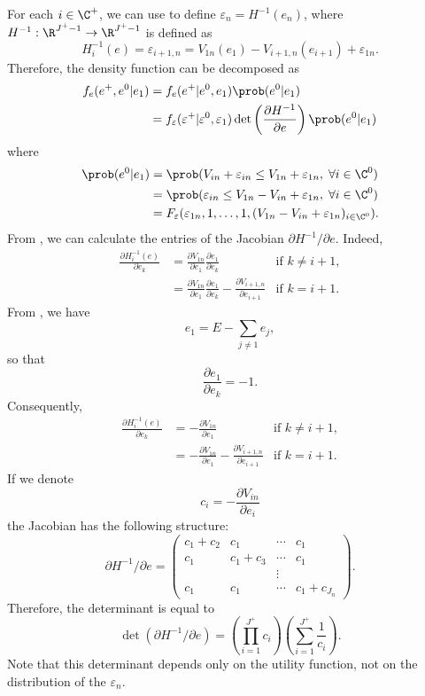 \documentclass[12pt,a4paper]{article}
\begin{document}
For each $i \in \C^+$, we can use 
to define $\varepsilon_n = H^{-1}(e_n)$, where $H^{-1}:\R^{J^+-1}\to\R^{J^+-1}$ is defined as  
\begin{equation}
  \label{eq:change_variable}
H_i^{-1}(e) = \varepsilon_{i+1,n}   =   V_{1n}(e_1) - V_{i+1,n}(e_{i+1}) + \varepsilon_{1n}.
\end{equation}
Therefore, the density function can be decomposed as
\begin{align*}
  f_e(e^+, e^0 | e_1) &= f_e(e^+ | e^0, e_1) \prob(e^0 |e_1) \\
                     &= f_\varepsilon(\varepsilon^+ | \varepsilon^0, \varepsilon_1) \det \left( \frac{\partial H^{-1}}{\partial e}\right)  \prob(e^0 |e_1)
\end{align*}
where
\begin{align*}
  \prob(e^0 |e_1) &= \prob(V_{in} + \varepsilon_{in}  \leq V_{1n} + \varepsilon_{1n},\; \forall i\in\C^0) \\
  &= \prob(\varepsilon_{in}  \leq V_{1n} -V_{in} + \varepsilon_{1n},\; \forall i\in\C^0) \\
  &= F_\varepsilon(\varepsilon_{1n}, 1, \ldots, 1, (V_{1n} -V_{in} + \varepsilon_{1n})_{i\in \C^0}).
\end{align*}
From , we can calculate the entries of the Jacobian $\partial H^{-1}/\partial e$. Indeed,
\begin{align*}
  \frac{\partial H_i^{-1}(e)}{\partial e_k} &= \frac{\partial V_{1n}}{\partial e_1}\frac{\partial e_1}{\partial e_k}  & \text{if } k \neq i+1, \\
  &= \frac{\partial V_{1n}}{\partial e_1}\frac{\partial e_1}{\partial e_k} - \frac{\partial V_{i+1,n}}{\partial e_{i+1}}& \text{if } k = i+1.
\end{align*}
From , we have
\[
e_1 = E - \sum_{j\neq 1} e_j,
\]
so that
\[
\frac{\partial e_1}{\partial e_k} = -1.
\]
Consequently,
\begin{align*}
  \frac{\partial H_i^{-1}(e)}{\partial e_k} &= -\frac{\partial V_{1n}}{\partial e_1}  & \text{if } k \neq i+1, \\
  &= -\frac{\partial V_{1n}}{\partial e_1} - \frac{\partial V_{i+1,n}}{\partial e_{i+1}}& \text{if } k = i+1.
\end{align*}
If we denote
\begin{equation}
c_i =  - \frac{\partial V_{in}}{\partial e_{i}}
\end{equation}
the Jacobian has the following structure:
\[
\partial H^{-1}/\partial e= \left(
\begin{array}{cccc}
  c_1 + c_2 & c_1 & \cdots & c_1 \\
  c_1      & c_1 + c_3 & \cdots & c_1 \\
  &          &   \vdots    \\
  c_1    &  c_1 & \cdots & c_1 + c_{J_n}
\end{array}
\right).
\]
Therefore, the determinant is equal to
\[
\det(\partial H^{-1}/\partial e) = \left(\prod_{i=1}^{J^+} c_i\right)\left(\sum_{i=1}^{J^+}\frac{1}{c_i}\right).
\]
Note that this determinant depends only on the utility function, not on the distribution of the $\varepsilon_n$.
\end{document}
